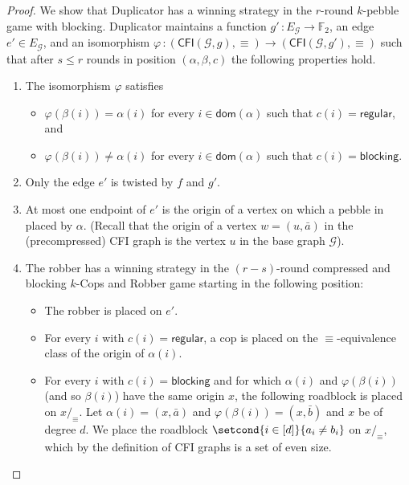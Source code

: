 \documentclass[10pt,a4paper]{article}
\newcommand{\regular}{\mathsf{regular}}
\newcommand{\blocking}{\mathsf{blocking}}
\renewcommand{\phi}{\varphi}
\newcommand{\comp}{\equiv}
\newcommand{\CFIsym}{\mathsf{CFI}}
\newcommand{\CFI}[1]{\CFIsym(#1)}
\newcommand{\precompCFI}[2]{{(\CFI{#1},#2)}}
\newcommand{\FF}{\mathbb{F}}
\newcommand{\tup}[1]{\bar{#1}}
\newcommand{\graphG}{\mathcal{G}}
\newcommand{\edgeG}{E_{\graphG}}
\newcommand{\dom}{\mathsf{dom}}
\begin{document}
%
\begin{proof}
        We show that Duplicator has a winning strategy in the $r$-round $k$-pebble game with blocking. Duplicator maintains a function $g' \, \colon \edgeG \to \FF_2$, an edge $e' \in \edgeG$,
        and an isomorphism $\phi  \, \colon \precompCFI{\graphG,g}{\comp} \to \precompCFI{\graphG,g'}{\comp}$ 
        such that after $s\leq r$ rounds in position $(\alpha, \beta, c)$ the following properties hold.
        \begin{enumerate}
                \item  \label{cond:iso} The isomorphism $\phi$ satisfies
                \begin{itemize} 
                \item $\phi(\beta(i)) = \alpha(i)$ for every $i\in \dom(\alpha)$ such that $c(i) = \regular$, and
                \item   $\phi(\beta(i)) \neq \alpha(i)$ for every $i\in \dom(\alpha)$ such that $c(i) = \blocking$.
                \end{itemize}
                \item \label{cond:one-twist} Only the edge $e'$ is twisted by $f$ and $g'$.
                \item \label{cond:not-caught} At most one endpoint of $e'$ is the origin of a vertex on which a pebble in placed by $\alpha$. (Recall that the origin of a vertex $w = (u, \tup{a})$ in the (precompressed) CFI graph is the vertex $u$ in the base graph $\graphG$).
                \item \label{cond:not-lose} The robber has a winning strategy in the $(r-s)$-round compressed and blocking $k$-Cops and Robber game
                starting in the following position:
                \begin{itemize}
                        \item The robber is placed on $e'$.
                        \item For every $i$ with $c(i) = \regular$, a cop is placed on
                        the $\comp$-equivalence class of the origin of $\alpha(i)$. 
                        \item For every $i$ with $c(i) = \blocking$
                        and for which $\alpha(i)$ and $\phi(\beta(i))$ (and so $\beta(i)$) have the same origin $x$,
                        the following roadblock is placed on $x/_\comp$. Let $\alpha(i) = (x,\tup{a})$ and $\phi(\beta(i)) = (x, \tup{b})$ and $x$ be of degree $d$. We place the roadblock $\setcond{i \in [d]} { a_i \neq b_i}$
                        on $x/_\comp$,
                        which by the definition of CFI graphs is a set of even size.
                \end{itemize}
        \end{enumerate}
        

\end{proof}
\end{document}
